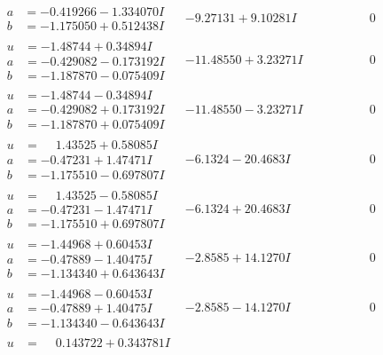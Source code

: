 \documentclass[1p]{elsarticle_modified}
\theoremstyle{definition}
\begin{document}
$$\begin{array}{c|c|c}
\begin{aligned}
a &= -0.419266 - 1.334070 I \\
b &= -1.175050 + 0.512438 I\end{aligned}
 & -9.27131 + 9.10281 I & \phantom{-0.000000 } 0 \\ \hline\begin{aligned}
u &= -1.48744 + 0.34894 I \\
a &= -0.429082 - 0.173192 I \\
b &= -1.187870 - 0.075409 I\end{aligned}
 & -11.48550 + 3.23271 I & \phantom{-0.000000 } 0 \\ \hline\begin{aligned}
u &= -1.48744 - 0.34894 I \\
a &= -0.429082 + 0.173192 I \\
b &= -1.187870 + 0.075409 I\end{aligned}
 & -11.48550 - 3.23271 I & \phantom{-0.000000 } 0 \\ \hline\begin{aligned}
u &= \phantom{-}1.43525 + 0.58085 I \\
a &= -0.47231 + 1.47471 I \\
b &= -1.175510 - 0.697807 I\end{aligned}
 & -6.1324 - 20.4683 I & \phantom{-0.000000 } 0 \\ \hline\begin{aligned}
u &= \phantom{-}1.43525 - 0.58085 I \\
a &= -0.47231 - 1.47471 I \\
b &= -1.175510 + 0.697807 I\end{aligned}
 & -6.1324 + 20.4683 I & \phantom{-0.000000 } 0 \\ \hline\begin{aligned}
u &= -1.44968 + 0.60453 I \\
a &= -0.47889 - 1.40475 I \\
b &= -1.134340 + 0.643643 I\end{aligned}
 & -2.8585 + 14.1270 I & \phantom{-0.000000 } 0 \\ \hline\begin{aligned}
u &= -1.44968 - 0.60453 I \\
a &= -0.47889 + 1.40475 I \\
b &= -1.134340 - 0.643643 I\end{aligned}
 & -2.8585 - 14.1270 I & \phantom{-0.000000 } 0 \\ \hline\begin{aligned}
u &= \phantom{-}0.143722 + 0.343781 I \\

\end{aligned}
\end{array}$$
\end{document}
